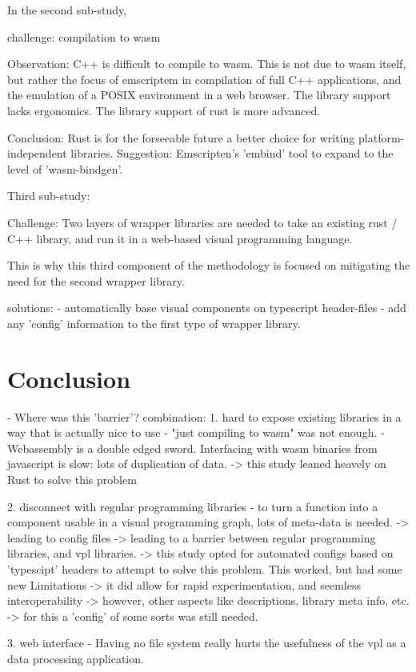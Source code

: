 In the second sub-study,

challenge: 
compilation to wasm

Observation: 
C++ is difficult to compile to wasm.
This is not due to wasm itself, but rather the focus of emscriptem in compilation of full C++ applications, and the emulation of a POSIX environment in a web browser. 
The library support lacks ergonomics.
The library support of rust is more advanced.

Conclusion: 
Rust is for the forseeable future a better choice for writing platform-independent libraries. 
Suggestion: Emscripten's 'embind' tool to expand to the level of 'wasm-bindgen'.

Third sub-study: 

Challenge:
Two layers of wrapper libraries are needed to take an existing rust / C++ library, and run it in a web-based visual programming language.

This is why this third component of the methodology is focused on mitigating the need for the second wrapper library. 

solutions: 
- automatically base visual components on typescript header-files
- add any 'config' information to the first type of wrapper library. 

\section{Conclusion}

- Where was this 'barrier'?
combination: 
1. hard to expose existing libraries in a way that is actually nice to use
- "just compiling to wasm" was not enough.
- Webassembly is a double edged sword. Interfacing with wasm binaries from javascript is slow: lots of duplication of data. 
-> this study leaned heavely on Rust to solve this problem

2. disconnect with regular programming libraries
- to turn a function into a component usable in a visual programming graph, lots of meta-data is needed. 
  -> leading to config files 
  -> leading to a barrier between regular programming libraries, and vpl libraries. 
  -> this study opted for automated configs based on 'typescipt' headers to attempt to solve this problem. This worked, but had some new Limitations
     -> it did allow for rapid experimentation, and seemless interoperability
     -> however, other aspects like descriptions, library meta info, etc. 
     -> for this a 'config' of some sorts was still needed. 

3. web interface
- Having no file system really hurts the usefulness of the vpl as a data processing application.

